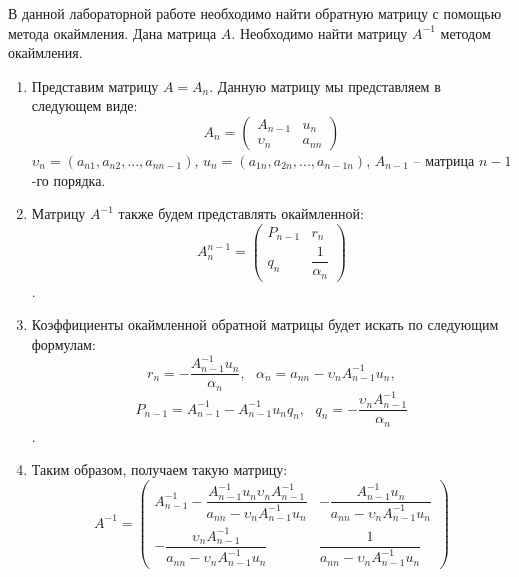 \documentclass[14pt, a4paper, fleqn]{extarticle}
\begin{document}
	\tableofcontents
	\pagebreak
	В данной лабораторной работе необходимо найти обратную матрицу с помощью метода окаймления.
	Дана матрица $A$. Необходимо найти матрицу $A^{-1}$ методом окаймления.
	\begin{enumerate}
		\item Представим матрицу $A = A_n$. Данную матрицу мы представляем в следующем виде:
		$$A_n = \begin{pmatrix}
		A_{n-1} & u_n \\
		\upsilon_n  & a_{nn}	
		\end{pmatrix}$$
		$\upsilon_n = (a_{n1}, a_{n2},  ..., a_{nn-1})$, $u_n = (a_{1n}, a_{2n},  ..., a_{n-1n})$, $A_{n-1}$ -- матрица $n-1$-го порядка.
		\item Матрицу $A^{-1}$ также будем представлять окаймленной:
		$$A_n^{n-1} = \begin{pmatrix}
			P_{n-1} & r_n \\
			q_n  & \dfrac{1}{\alpha_n}	
		\end{pmatrix}$$.
		\item Коэффициенты окаймленной обратной матрицы будет искать по следующим формулам:
		$$r_n = -\dfrac{A^{-1}_{n-1}u_n}{\alpha_n}, ~~~ \alpha_n = a_{nn} - \upsilon_nA^{-1}_{n-1}u_n, $$
		$$P_{n-1} = A^{-1}_{n-1} - A^{-1}_{n-1}u_nq_n, ~~~ q_n = -\dfrac{\upsilon_nA^{-1}_{n-1}}{\alpha_n} $$.
		
		\item Таким образом, получаем такую матрицу:
		$$
		A^{-1} = \begin{pmatrix}
			A^{-1}_{n-1} - \dfrac{A^{-1}_{n-1}u_n\upsilon_nA^{-1}_{n-1}}{a_{nn} - \upsilon_nA^{-1}_{n-1}u_n} & -\dfrac{A^{-1}_{n-1}u_n}{a_{nn} - \upsilon_nA^{-1}_{n-1}u_n} \\
			-\dfrac{\upsilon_nA^{-1}_{n-1}}{a_{nn} - \upsilon_nA^{-1}_{n-1}u_n}  & \dfrac{1}{a_{nn} - \upsilon_nA^{-1}_{n-1}u_n}	
		\end{pmatrix}
		$$
	\end{enumerate}
	
	
	
\end{document}
